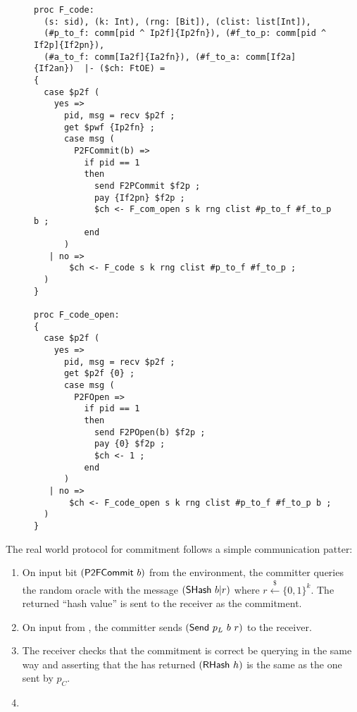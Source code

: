 \begin{figure*}
\begin{lstlisting}[basicstyle=\small\BeraMonottFamily]
proc F_code:
  (s: sid), (k: Int), (rng: [Bit]), (clist: list[Int]),
  (#p_to_f: comm[pid ^ Ip2f]{Ip2fn}), (#f_to_p: comm[pid ^ If2p]{If2pn}),
  (#a_to_f: comm[Ia2f]{Ia2fn}), (#f_to_a: comm[If2a]{If2an})  |- ($ch: FtOE) =
{
  case $p2f (
    yes =>	
      pid, msg = recv $p2f ;
      get $pwf {Ip2fn} ;
      case msg (
        P2FCommit(b) =>	
          if pid == 1
          then
            send F2PCommit $f2p ;
            pay {If2pn} $f2p ;
            $ch <- F_com_open s k rng clist #p_to_f #f_to_p b ;
          end
      )
   | no =>  
       $ch <- F_code s k rng clist #p_to_f #f_to_p ;
  )
}

proc F_code_open:
{
  case $p2f (
    yes =>	
      pid, msg = recv $p2f ;
      get $p2f {0} ;
      case msg (
        P2FOpen =>	
          if pid == 1
          then
            send F2POpen(b) $f2p ;
            pay {0} $f2p ;
            $ch <- 1 ;
          end
      )
   | no =>
       $ch <- F_code_open s k rng clist #p_to_f #f_to_p b ;
  )
}
\end{lstlisting}
\end{figure*}

The real world protocol for commitment follows a simple communication patter:
\begin{enumerate}
\item On input bit $(\msf{P2FCommit}\ b)$ from the environment, the committer queries the random oracle with the message $({\mathsf {SHash}}\ b | r)$ where $r \xleftarrow{\$} \{0,1\}^k$.
The returned ``hash value'' is sent to the receiver as the commitment.
\item On input  from \Environment, the committer sends $({\mathsf {Send}}\ p_L\ b\ r)$ to the receiver.
\item The receiver checks that the commitment is correct be querying \Fro in the same way and asserting that the has returned $({\mathsf {RHash}}\ h)$ is the same as the one sent by $p_C$.
\item {}
\end{enumerate}

